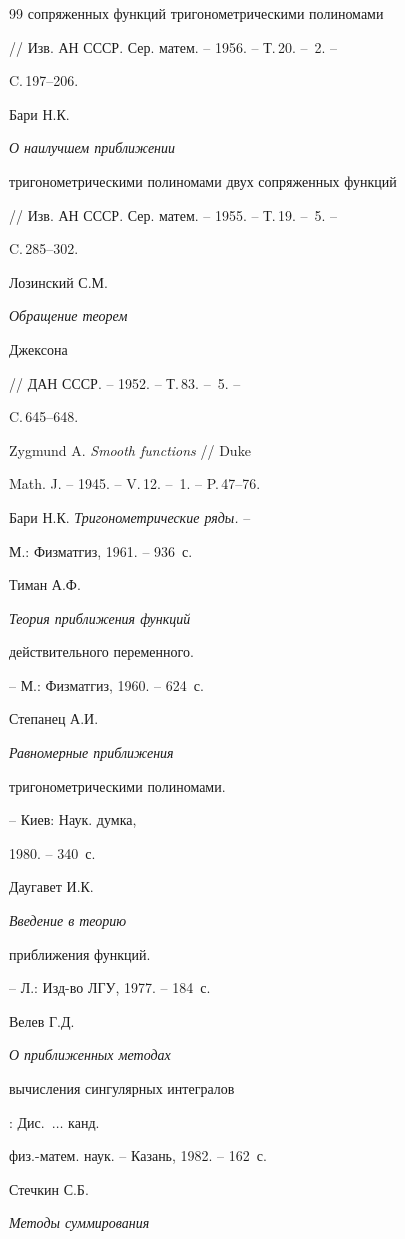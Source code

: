 \begin{thebibliography}{99}
{сопряженных функций тригонометрическими полиномами}


// Изв. АН СССР. Сер. матем. -- 1956. -- Т.\,20. -- \No\,2. --


C.\,197--206.




Бари Н.К. {\em О наилучшем приближении


тригонометрическими полиномами двух сопряженных функций}


// Изв. АН СССР. Сер. матем. -- 1955. -- Т.\,19. -- \No\,5. --


C.\,285--302.




Лозинский С.М. {\em Обращение теорем


Джексона} // ДАН СССР. -- 1952. -- Т.\,83. -- \No\,5. --


C.\,645--648.




Zygmund A. {\em Smooth functions} // Duke


Math. J. -- 1945. -- V.\,12. -- \No\,1. -- P.\,47--76.




Бари Н.К. {\em Тригонометрические ряды.} --


М.: Физматгиз, 1961. -- 936~с.




Тиман А.Ф. {\em Теория приближения функций


действительного переменного.} -- М.: Физматгиз, 1960. -- 624~с.




Степанец А.И. {\em Равномерные приближения


тригонометрическими полиномами.} -- Киев: Наук. думка,


1980. -- 340~с.




Даугавет И.К. {\em Введение в теорию


приближения функций.} -- Л.: Изд-во ЛГУ, 1977. -- 184~с.




Велев Г.Д. {\em О приближенных методах


вычисления сингулярных интегралов}: Дис.~$\dotsc$ канд.


физ.-матем. наук. -- Казань, 1982. -- 162~с.




Стечкин С.Б. {\em Методы суммирования


}
\end{thebibliography}
